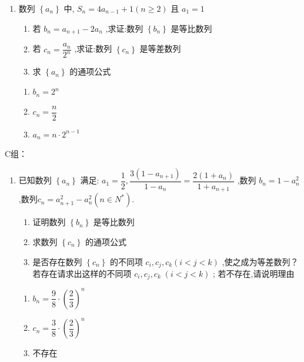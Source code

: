 \begin{enumerate}
    \item 数列 $\left\{  {a}_{n}\right\}$ 中, ${S}_{n} = 4{a}_{n - 1} + 1\left( {n \geq  2}\right)$ 且 ${a}_{1} = 1$ 
    \begin{enumerate}
        \item 若 ${b}_{n} = {a}_{n + 1} - 2{a}_{n}$ ,求证:数列 $\left\{  {b}_{n}\right\}$ 是等比数列
        \item 若 ${c}_{n} = \dfrac{{a}_{n}}{{2}^{n}}$ ,求证:数列 $\left\{  {c}_{n}\right\}$ 是等差数列
        \item 求 $\left\{  {a}_{n}\right\}$ 的通项公式
    \end{enumerate}
    \begin{jieda}
        \begin{enumerate}
            \item $b_n = 2^n$
            \item $c_n = \dfrac{n}{2}$
            \item $a_n = n \cdot 2^{n-1}$
        \end{enumerate}
    \end{jieda}
\end{enumerate}

    C组：
    \begin{enumerate}
        \item 已知数列 $\left\{  {a}_{n}\right\}$ 满足: ${a}_{1} = \dfrac{1}{2},\dfrac{3\left( {1 - {a}_{n + 1}}\right) }{1 - {a}_{n}} = \dfrac{2\left( {1 + {a}_{n}}\right) }{1 + {a}_{n + 1}}$ ,数列 ${b}_{n} = 1 - {a}_{n}^{2}$ ,数列${c}_{n} = {a}_{n + 1}^{2} - {a}_{n}^{2}\left( {n \in  {N}^{ * }}\right) .$
    \begin{enumerate}
        \item 证明数列 $\left\{  {b}_{n}\right\}$ 是等比数列
        \item 求数列 $\left\{  {c}_{n}\right\}$ 的通项公式
        \item 是否存在数列 $\left\{  {c}_{n}\right\}$ 的不同项 ${c}_{i},{c}_{j},{c}_{k}\left( {i < j < k}\right)$ ,使之成为等差数列？若存在请求出这样的不同项 ${c}_{i},{c}_{j},{c}_{k}\;\left( {i < j < k}\right)$ ; 若不存在,请说明理由
    \end{enumerate}
    \begin{jieda}
        \begin{enumerate}
            \item $b_n = \dfrac{9}{8} \cdot \left(\dfrac{2}{3}\right)^n$
            \item $c_n = \dfrac{3}{8} \cdot \left(\dfrac{2}{3}\right)^n$
            \item 不存在
        \end{enumerate}
    \end{jieda}
    \end{enumerate}

